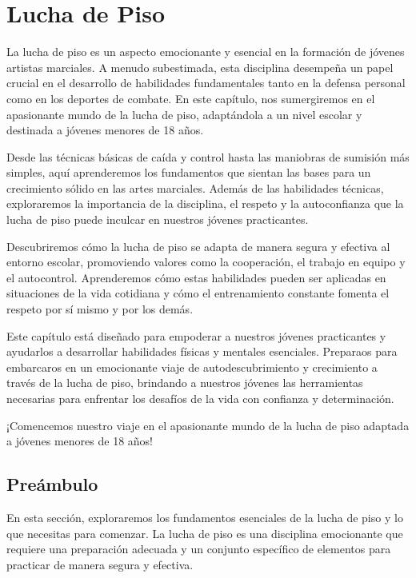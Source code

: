 \chapter{Lucha de Piso}

La lucha de piso es un aspecto emocionante y esencial en la formación de jóvenes artistas marciales. A menudo subestimada, esta disciplina desempeña un papel crucial en el desarrollo de habilidades fundamentales tanto en la defensa personal como en los deportes de combate. En este capítulo, nos sumergiremos en el apasionante mundo de la lucha de piso, adaptándola a un nivel escolar y destinada a jóvenes menores de 18 años.

Desde las técnicas básicas de caída y control hasta las maniobras de sumisión más simples, aquí aprenderemos los fundamentos que sientan las bases para un crecimiento sólido en las artes marciales. Además de las habilidades técnicas, exploraremos la importancia de la disciplina, el respeto y la autoconfianza que la lucha de piso puede inculcar en nuestros jóvenes practicantes.

Descubriremos cómo la lucha de piso se adapta de manera segura y efectiva al entorno escolar, promoviendo valores como la cooperación, el trabajo en equipo y el autocontrol. Aprenderemos cómo estas habilidades pueden ser aplicadas en situaciones de la vida cotidiana y cómo el entrenamiento constante fomenta el respeto por sí mismo y por los demás.

Este capítulo está diseñado para empoderar a nuestros jóvenes practicantes y ayudarlos a desarrollar habilidades físicas y mentales esenciales. Preparaos para embarcaros en un emocionante viaje de autodescubrimiento y crecimiento a través de la lucha de piso, brindando a nuestros jóvenes las herramientas necesarias para enfrentar los desafíos de la vida con confianza y determinación.

¡Comencemos nuestro viaje en el apasionante mundo de la lucha de piso adaptada a jóvenes menores de 18 años!

\section{Preámbulo}

En esta sección, exploraremos los fundamentos esenciales de la lucha de piso y lo que necesitas para comenzar. La lucha de piso es una disciplina emocionante que requiere una preparación adecuada y un conjunto específico de elementos para practicar de manera segura y efectiva.

